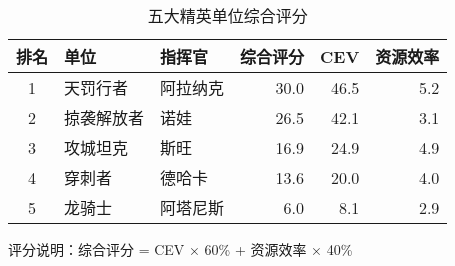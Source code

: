 \documentclass[border=10pt]{standalone}
\begin{document}
\begin{table}[H]
\centering
\caption{五大精英单位综合评分}
\begin{tabular}{cllrrr}
\toprule
排名 & 单位 & 指挥官 & 综合评分 & CEV & 资源效率 \\
\midrule
\rowcolor{yellow!30} 1 & 天罚行者 & 阿拉纳克 & 30.0 & 46.5 & 5.2 \\
\rowcolor{gray!20} 2 & 掠袭解放者 & 诺娃 & 26.5 & 42.1 & 3.1 \\
\rowcolor{orange!20} 3 & 攻城坦克 & 斯旺 & 16.9 & 24.9 & 4.9 \\
4 & 穿刺者 & 德哈卡 & 13.6 & 20.0 & 4.0 \\
5 & 龙骑士 & 阿塔尼斯 & 6.0 & 8.1 & 2.9 \\
\bottomrule
\end{tabular}
\label{tab:scores}
\end{table}

{\small 评分说明：综合评分 = CEV × 60\% + 资源效率 × 40\%}
\end{document}
